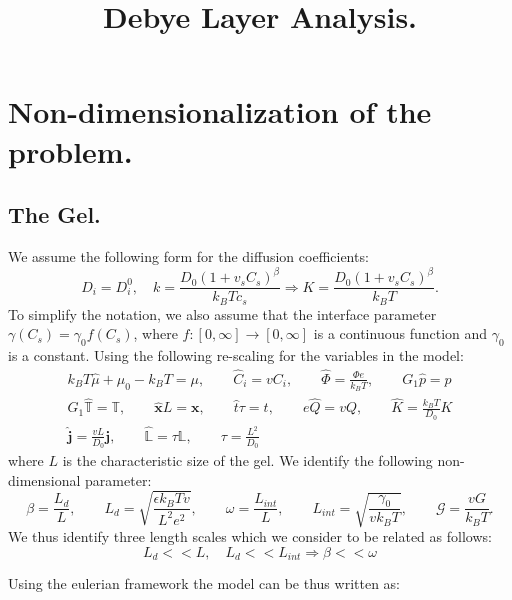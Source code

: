 \documentclass[12pt]{extarticle}
\title{Debye Layer Analysis.}
\author{}
\newcommand{\LL}{\ensuremath{\mathbb{L}}}
\begin{document}
\section{Non-dimensionalization of the problem.}
\subsection{The Gel.}
We assume the following form for the diffusion coefficients:
\begin{equation}
D_i=D_i^0,\quad k = \frac{D_0(1+v_sC_s)^\beta}{k_B T c_s} \Rightarrow K=  \frac{D_0(1+v_sC_s)^\beta}{k_B T}.
\end{equation}
To simplify the notation, we also assume that the interface parameter $\gamma(C_s)=\gamma_0 f(C_s)$, where $f:[0,\infty]\rightarrow[0,\infty]$ is a continuous function and $\gamma_0$ is a constant. 
Using the following re-scaling for the variables in the model:
\begin{equation*}
\begin{aligned}
k_BT\hat{\mu} + \mu_0 -k_BT= \mu, \qquad \hat{C}_i = vC_i, \qquad \hat{\Phi} = \frac{\Phi e}{k_B T}, \qquad  G_1\hat{p}= p\\
G_1\hat{\mathbb{T}}=\mathbb{T}, \qquad\hat{\mathbf{x}} L =\mathbf{x}, \qquad \hat{t}\tau=t, \qquad e\hat{Q} =v Q, \qquad \hat{K} = \frac{k_BT}{D_0}K\\
\hat{\mathbf{j}}=\frac{vL}{D_0}\mathbf{j}, \qquad \hat{\LL}= \tau \LL, \qquad \tau=\frac{L^2}{D_0}
\end{aligned}
\end{equation*}
where $L$ is the characteristic size of the gel. We identify the following non-dimensional parameter:
\begin{equation*}
\beta=\frac{L_d}{L}, \qquad L_d= \sqrt{\frac{\epsilon k_B Tv}{L^2e^2}}, \qquad \omega= \frac{L_{int}}{L}, \qquad L_{int}=\sqrt{\frac{\gamma_0}{vk_BT}}, \qquad \mathcal{G}=\frac{vG}{k_BT}.
\end{equation*}
We thus identify three length scales which we consider to be related as follows:
\begin{equation}
L_d<<L, \quad L_d<<L_{int} \Rightarrow \beta<<\omega
\end{equation}

Using the eulerian framework the model can be thus written as:
\end{document}
